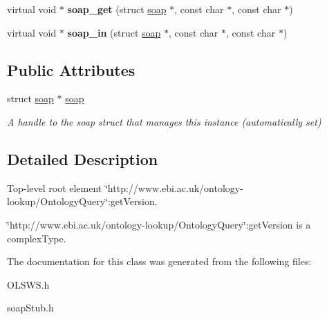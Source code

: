 \begin{DoxyCompactItemize}
\item 
\hypertarget{class__ns1____getVersion_ab14cce71d9dba04ddc51acfa3b456f01}{
virtual void $\ast$ {\bfseries soap\_\-get} (struct \hyperlink{class__ns1____getVersion_af1f697243ccc2fdb1ab70328266d1fa0}{soap} $\ast$, const char $\ast$, const char $\ast$)}
\label{class__ns1____getVersion_ab14cce71d9dba04ddc51acfa3b456f01}

\item 
\hypertarget{class__ns1____getVersion_ada872ef0084744a832b504c80c4c8a73}{
virtual void $\ast$ {\bfseries soap\_\-in} (struct \hyperlink{class__ns1____getVersion_af1f697243ccc2fdb1ab70328266d1fa0}{soap} $\ast$, const char $\ast$, const char $\ast$)}
\label{class__ns1____getVersion_ada872ef0084744a832b504c80c4c8a73}

\end{DoxyCompactItemize}
\subsection*{Public Attributes}
\begin{DoxyCompactItemize}
\item 
\hypertarget{class__ns1____getVersion_af1f697243ccc2fdb1ab70328266d1fa0}{
struct \hyperlink{class__ns1____getVersion_af1f697243ccc2fdb1ab70328266d1fa0}{soap} $\ast$ \hyperlink{class__ns1____getVersion_af1f697243ccc2fdb1ab70328266d1fa0}{soap}}
\label{class__ns1____getVersion_af1f697243ccc2fdb1ab70328266d1fa0}

\begin{DoxyCompactList}\small\item\em A handle to the soap struct that manages this instance (automatically set) \end{DoxyCompactList}\end{DoxyCompactItemize}


\subsection{Detailed Description}
Top-\/level root element \char`\"{}http://www.ebi.ac.uk/ontology-\/lookup/OntologyQuery\char`\"{}:getVersion. 

\char`\"{}http://www.ebi.ac.uk/ontology-\/lookup/OntologyQuery\char`\"{}:getVersion is a complexType. 

The documentation for this class was generated from the following files:\begin{DoxyCompactItemize}
\item 
OLSWS.h\item 
soapStub.h\end{DoxyCompactItemize}
